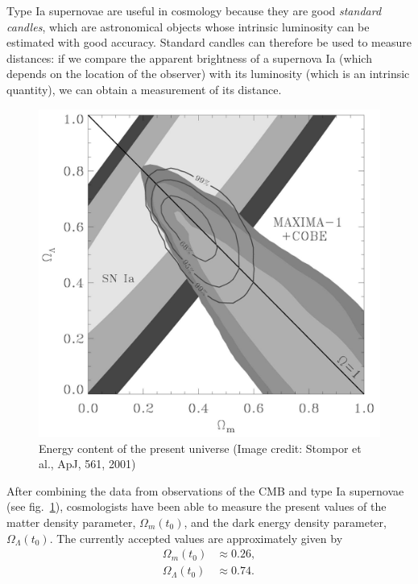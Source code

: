 \documentclass[11pt, a4paper,oneside,openright]{book}
\numberwithin{equation}{section}
\begin{document}
Type Ia supernovae are useful in cosmology because they are good {\it standard candles}, which are astronomical objects whose intrinsic luminosity can be estimated with good accuracy. Standard candles can therefore be used to measure distances: if we compare the apparent brightness of a supernova Ia (which depends on the location of the observer) with its luminosity (which is an intrinsic quantity), we can obtain a measurement of its distance.
\begin{figure}[ht]
\begin{center}
\includegraphics[scale=0.25]{Draw/lec10_2.png}
\end{center}
\caption{Energy content of the present universe (Image credit: Stompor et al., ApJ, 561, 2001)}
\label{fig:lec10_2}
\end{figure}

After combining the data from observations of the CMB and type Ia supernovae (see fig.\ \ref{fig:lec10_2}), cosmologists have been able to measure the present values of the matter density parameter, $\Omega_m(t_0)$, and the dark energy density parameter, $\Omega_{\Lambda}(t_0)$. The currently accepted values are approximately given by
\begin{equation}
\begin{split}
\Omega_m(t_0)&\approx 0.26,\\
\Omega_{\Lambda}(t_0)&\approx 0.74.
\end{split}
\end{equation}
\end{document}
